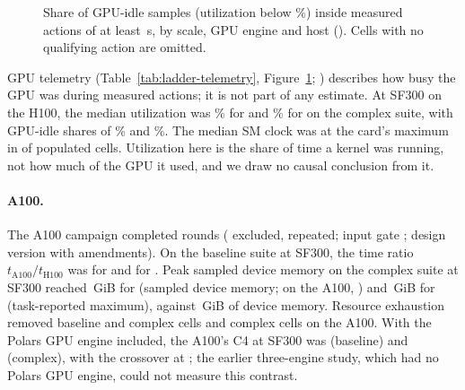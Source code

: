 \documentclass[11pt]{article}
\begin{document}
\begin{figure}[t]
\centering
{}
\caption{Share of GPU-idle samples (utilization below
\%) inside measured
actions of at least \,s,
by scale, GPU engine and host ().
Cells with no qualifying action are omitted.}
\label{fig:f12}
\end{figure}

GPU telemetry (Table~\ref{tab:ladder-telemetry}, Figure~\ref{fig:f12};
) describes how busy the GPU was during
measured actions; it is not part of any estimate. At SF300 on the H100, the
median utilization was \% for
\polarsgpu{} and \% for \sparkgpu{} on
the complex suite, with GPU-idle shares of
\% and
\%. The median SM clock was at the
card's maximum in  of 
populated cells. Utilization here is the share of time a kernel was running, not
how much of the GPU it used, and we draw no causal conclusion from it.

\ifaonehundredran
\paragraph{A100.} The A100 campaign completed
 rounds ( excluded,
 repeated; input gate ; design
version \texttt{} with
 amendments). On the
baseline suite at SF300, the time ratio $t_{\mathrm{A100}}/t_{\mathrm{H100}}$
was  for \polarsgpu{} and
 for \sparkgpu{}. Peak sampled
device memory on the complex suite at SF300 reached
\,GiB for \polarsgpu{}
(sampled device memory; on the A100, ) and
\,GiB for \sparkgpu{}
(task-reported maximum), against
\,GiB of device memory.
Resource exhaustion removed 
baseline and  complex
\polarsgpu{} cells and 
complex \sparkgpu{} cells on the A100. With the Polars GPU engine included,
the A100's C4 at SF300 was  (baseline) and
 (complex), with the crossover at
; the earlier three-engine study, which
had no Polars GPU engine, could not measure this contrast.
\fi
\ifghtwohundredran
\end{document}
